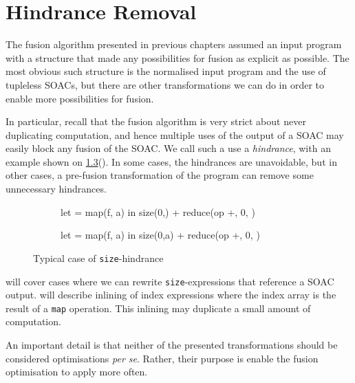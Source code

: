 \chapter{Hindrance Removal}
\label{chap:hindrance-removal}

The fusion algorithm presented in previous chapters assumed an input
program with a structure that made any possibilities for fusion as
explicit as possible.  The most obvious such structure is the
normalised input program and the use of tupleless SOACs, but there are
other transformations we can do in order to enable more possibilities
for fusion.

In particular, recall that the fusion algorithm is very strict about
never duplicating computation, and hence multiple uses of the output
of a SOAC may easily block any fusion of the SOAC.  We call such a use
a \textit{hindrance}, with an example shown on
\cref{fig:size-hindrance}().  In
some cases, the hindrances are unavoidable, but in other cases, a
pre-fusion transformation of the program can remove some unnecessary
hindrances.

\begin{figure}
\begin{subfigure}[t]{.5\textwidth}
\begin{colorcode}
let  = map(f, a) in
size(0,) + reduce(op +, 0, )
\end{colorcode}
\label{fig:size-hindrance-blocking}
\end{subfigure}%
\begin{subfigure}[t]{.5\textwidth}
\begin{colorcode}
let  = map(f, a) in
size(0,a) + reduce(op +, 0, )
\end{colorcode}
\label{fig:size-hindrance-removed}
\end{subfigure}%
\caption{Typical case of \texttt{size}-hindrance}
\label{fig:size-hindrance}
\end{figure}

 will cover cases where we can
rewrite \texttt{size}-expressions that reference a SOAC output.
 will describe inlining of index
expressions where the index array is the result of a \texttt{map}
operation.  This inlining may duplicate a small amount of computation.

An important detail is that neither of the presented transformations
should be considered optimisations \textit{per se}.  Rather, their
purpose is enable the fusion optimisation to apply more often.

